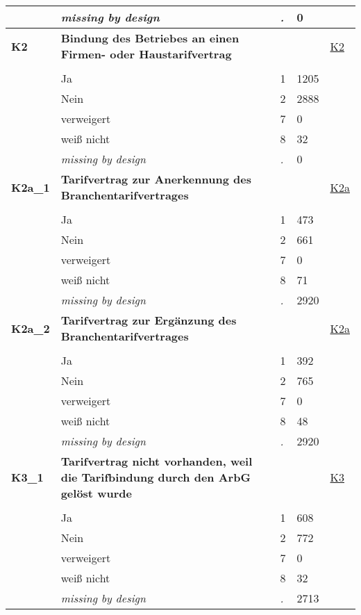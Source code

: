\begin{longtable}{| L{2.65cm} | L{8cm} | C{1.5cm} | R{1.25cm} | C{2.25cm}  |}
   & \textit{missing by design} & \textit{.} & 0 &  \\ 
   \midrule
\textbf{K2}\label{var:K2} & \textbf{Bindung des Betriebes an einen Firmen- oder Haustarifvertrag} &  &  & \hyperref[K2]{K2} \\ 
   &  &  &  &  \\ 
   & Ja & 1 & 1205 &  \\ 
   & Nein & 2 & 2888 &  \\ 
   & verweigert & 7 & 0 &  \\ 
   & weiß nicht & 8 & 32 &  \\ 
   & \textit{missing by design} & \textit{.} & 0 &  \\ 
   \midrule
\textbf{K2a\_1}\label{var:K2a:1} & \textbf{Tarifvertrag zur Anerkennung des Branchentarifvertrages} &  &  & \hyperref[K2a]{K2a} \\ 
   &  &  &  &  \\ 
   & Ja & 1 & 473 &  \\ 
   & Nein & 2 & 661 &  \\ 
   & verweigert & 7 & 0 &  \\ 
   & weiß nicht & 8 & 71 &  \\ 
   & \textit{missing by design} & \textit{.} & 2920 &  \\ 
   \midrule
\textbf{K2a\_2}\label{var:K2a:2} & \textbf{Tarifvertrag zur Ergänzung des Branchentarifvertrages} &  &  & \hyperref[K2a]{K2a} \\ 
   &  &  &  &  \\ 
   & Ja & 1 & 392 &  \\ 
   & Nein & 2 & 765 &  \\ 
   & verweigert & 7 & 0 &  \\ 
   & weiß nicht & 8 & 48 &  \\ 
   & \textit{missing by design} & \textit{.} & 2920 &  \\ 
   \midrule
\textbf{K3\_1}\label{var:K3:1} & \textbf{Tarifvertrag nicht vorhanden, weil die Tarifbindung durch den ArbG gelöst wurde} &  &  & \hyperref[K3]{K3} \\ 
   &  &  &  &  \\ 
   & Ja & 1 & 608 &  \\ 
   & Nein & 2 & 772 &  \\ 
   & verweigert & 7 & 0 &  \\ 
   & weiß nicht & 8 & 32 &  \\ 
   & \textit{missing by design} & \textit{.} & 2713 &  \\ 

\end{longtable}
